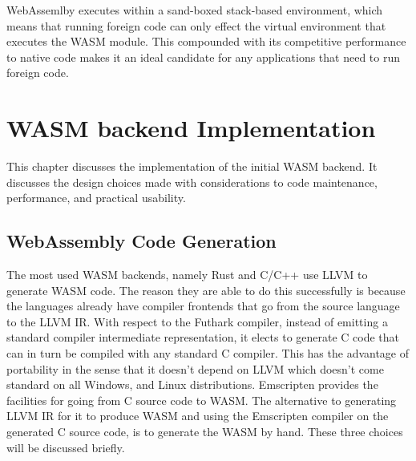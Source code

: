 \documentclass[11pt]{book}
\begin{document}
WebAssemlby executes within a sand-boxed stack-based environment, which means that running foreign code can only effect the virtual environment that executes the WASM module. This compounded with its competitive performance to native code makes it an ideal candidate for any applications that need to run foreign code. 




\chapter{WASM backend Implementation}

This chapter discusses the implementation of the initial WASM backend. It discusses the design choices made with considerations to code maintenance, performance, and practical usability. 


\section{WebAssembly Code Generation}

The most used WASM backends, namely Rust and C/C++ use LLVM to generate WASM code. The reason they are able to do this successfully is because the languages already have compiler frontends that go from the source language to the LLVM IR. With respect to the Futhark compiler, instead of emitting a standard compiler intermediate representation, it elects to generate C code that can in turn be compiled with any standard C compiler. This has the advantage of portability in the sense that it doesn't depend on LLVM which doesn't come standard on all Windows, and Linux distributions. Emscripten provides the facilities for going from C source code to WASM. The alternative to generating LLVM IR for it to produce WASM and using the Emscripten compiler on the generated C source code, is to generate the WASM by hand. These three choices will be discussed briefly.
\end{document}

